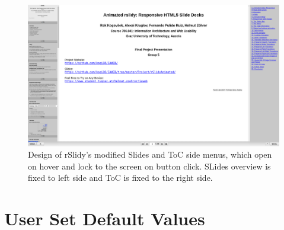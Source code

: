 \begin{figure}[tp]
	\centering
	\includegraphics[width = .9\textwidth]{images/sidemenus.png}
	
	\caption[Modified Side Menus]{
		Design of rSlidy's modified Slides and ToC side menus, which open on hover and lock to the screen on button click. SLides overview is fixed to left side and ToC is fixed to the right side.
	}
	\label{fig:sideNEW}
\end{figure}


\section{User Set Default Values} %
\label{sec:user_settings}

